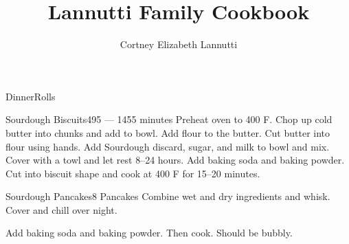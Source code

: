 \documentclass[a4paper]{article}
\title{Lannutti Family Cookbook}
\author{Cortney Elizabeth Lannutti}
\date{}
\begin{document}
\maketitle

{DinnerRolls}

\begin{recipe}{Sourdough Biscuits}{}{495 --- 1455 minutes}
    Preheat oven to 400\degrees{} F.
    Chop up cold butter into chunks and add to bowl.
    Add flour to the butter. Cut butter into flour using hands.
    Add Sourdough discard, sugar, and milk to bowl and mix. Cover with a towl and let rest 8--24 hours.
    Add baking soda and baking powder. Cut into biscuit shape and cook at 400\degrees{} F for 15--20 minutes.
\end{recipe}

\begin{recipe}{Sourdough Pancakes}{8 Pancakes}{}
    Combine wet and dry ingredients and whisk. Cover and chill over night.

    Add baking soda and baking powder. Then cook. Should be bubbly.
\end{recipe}
\end{document}
